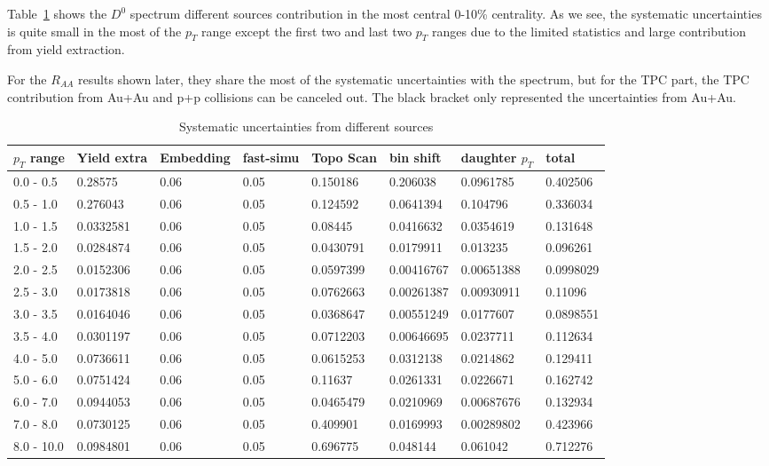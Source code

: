 \documentclass[a4paper]{article}
\begin{document}
Table~\ref{syserr} shows the $D^0$ spectrum different sources contribution in the most central 0-10\% centrality. As we see, the systematic uncertainties is quite small in the most of the $p_T$ range except the first two and last two $p_T$ ranges due to the limited statistics and large contribution from yield extraction.

For the $R_{AA}$ results shown later, they share the most of the systematic uncertainties with the spectrum, but for the TPC part, the TPC contribution from Au+Au and p+p collisions can be canceled out. The black bracket only represented the uncertainties from Au+Au.

\begin{table}[htp]
\centering
\caption{Systematic uncertainties from different sources}
\label{syserr}
	\begin{center}
	\begin{tabular}{l|l|l|l|l|l|l|l}
  \Xhline{1.6pt}
  $p_T$ range&Yield extra&Embedding&fast-simu&Topo Scan&bin shift&daughter $p_T$&total\\ \hline
  0.0 -  0.5  &   0.28575        &  0.06     &  0.05           & 0.150186  &  0.206038   &  0.0961785  &   0.402506  \\ \hline
	0.5 - 1.0   &   0.276043       &  0.06     &  0.05           & 0.124592  &  0.0641394  &  0.104796   &   0.336034  \\ \hline
	1.0 - 1.5   &   0.0332581      &  0.06     &  0.05           & 0.08445   &  0.0416632  &  0.0354619  &   0.131648  \\ \hline
	1.5 - 2.0   &   0.0284874      &  0.06     &  0.05           & 0.0430791 &  0.0179911  &  0.013235   &   0.096261  \\ \hline
	2.0 - 2.5   &   0.0152306      &  0.06     &  0.05           & 0.0597399 &  0.00416767 &  0.00651388 &   0.0998029 \\ \hline
  2.5 - 3.0   &   0.0173818      &  0.06     &  0.05           & 0.0762663 &  0.00261387 &  0.00930911 &   0.11096   \\ \hline
  3.0 - 3.5   &   0.0164046      &  0.06     &  0.05           & 0.0368647 &  0.00551249 &  0.0177607  &   0.0898551 \\ \hline
  3.5 - 4.0   &   0.0301197      &  0.06     &  0.05           & 0.0712203 &  0.00646695 &  0.0237711  &   0.112634  \\ \hline
  4.0 - 5.0   &   0.0736611      &  0.06     &  0.05           & 0.0615253 &  0.0312138  &  0.0214862  & 0.129411      \\ \hline
  5.0 - 6.0   &   0.0751424      &  0.06     &  0.05           & 0.11637   &  0.0261331  &  0.0226671  & 0.162742      \\ \hline
  6.0 - 7.0   &   0.0944053      &  0.06     &  0.05           & 0.0465479 &  0.0210969  &  0.00687676 & 0.132934      \\ \hline
  7.0 - 8.0   &   0.0730125      &  0.06     &  0.05           & 0.409901  &  0.0169993  &  0.00289802 & 0.423966      \\ \hline
  8.0 - 10.0  &   0.0984801      &  0.06     &  0.05           & 0.696775  & 0.048144    &  0.061042   &  0.712276    \\ \hline


\end{tabular}
\end{center}
\end{table}
\end{document}
